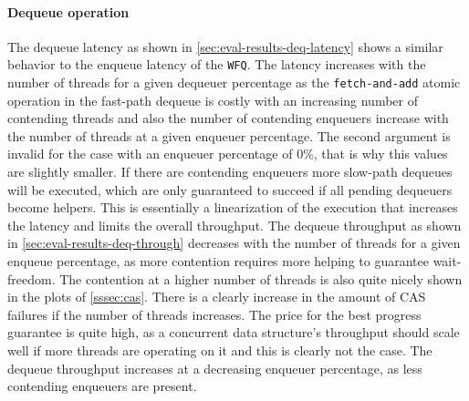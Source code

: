 \documentclass{article}
\newcommand{\WFQ}{\texttt{WFQ}}
\begin{document}
\paragraph{Dequeue operation}
The dequeue latency as shown in \ref{sec:eval-results-deq-latency} shows a similar behavior to the enqueue latency of the \WFQ{}. The latency increases with the number of threads for a given dequeuer percentage as the \texttt{fetch-and-add} atomic operation in the fast-path dequeue is costly with an increasing number of contending threads and also the number of contending enqueuers increase with the number of threads at a given enqueuer percentage. The second argument is invalid for the case with an enqueuer percentage of 0\%, that is why this values are slightly smaller. If there are contending enqueuers more slow-path dequeues will be executed, which are only guaranteed to succeed if all pending dequeuers become helpers. This is essentially a linearization of the execution that increases the latency and limits the overall throughput. The dequeue throughput as shown in \ref{sec:eval-results-deq-through} decreases with the number of threads for a given enqueue percentage, as more contention requires more helping to guarantee wait-freedom. The contention at a higher number of threads is also quite nicely shown in the plots of \ref{sssec:cas}. There is a clearly increase in the amount of CAS failures if the number of threads increases. The price for the best progress guarantee is quite high, as a concurrent data structure's throughput should scale well if more threads are operating on it and this is clearly not the case. The dequeue throughput increases at a decreasing enqueuer percentage, as less contending enqueuers are present.
\end{document}
